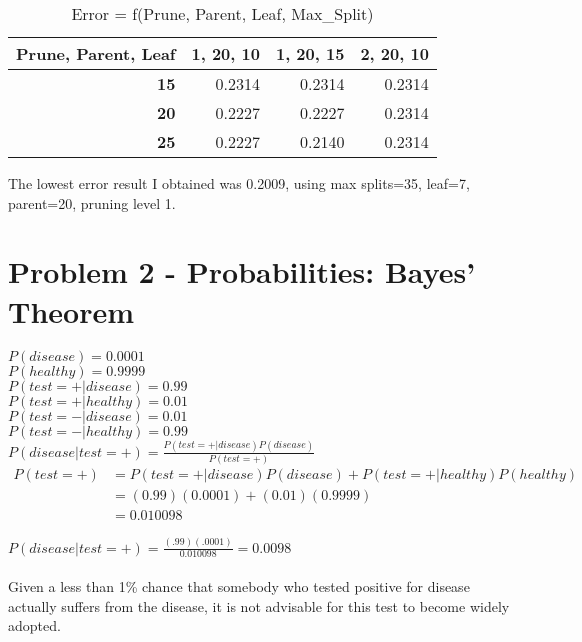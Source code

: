 \documentclass[12pt, letterpaper]{report}
\begin{document}
\begin{table}[H]
	\centering
	\begin{tabular}{ |r|r|r|r| }
		\hline
		\textbf{Prune, Parent, Leaf} & \textbf{1, 20, 10} & \textbf{1, 20, 15} & \textbf{2, 20, 10} \\
		\hline
		\textbf{15} & 0.2314 & 0.2314 & 0.2314 \\
		\hline
		\textbf{20} & 0.2227 & 0.2227 & 0.2314 \\
		\hline
		\textbf{25} & 0.2227 & 0.2140 & 0.2314 \\
		\hline
	\end{tabular}
	\caption{Error = f(Prune, Parent, Leaf, Max\_Split)}
\end{table}


The lowest error result I obtained was 0.2009, using max splits=35, leaf=7, parent=20, pruning level 1.


\section{Problem 2 - Probabilities: Bayes' Theorem}

$P(disease) = 0.0001$ \\
$P(healthy) = 0.9999$ \\
$P(test = + | disease) = 0.99$ \\
$P(test = + | healthy) = 0.01$ \\
$P(test = - | disease) = 0.01$ \\
$P(test = - | healthy) = 0.99$ \\

$P(disease | test = +) = \frac{P(test = + | disease)P(disease)}{P(test = +)}$ \\

\begin{equation*}
\begin{split}
P(test = +) &= P(test = + | disease)P(disease) + P(test = + | healthy)P(healthy)\\
&= (0.99)(0.0001) + (0.01)(0.9999)\\
&= 0.010098
\end{split}
\end{equation*}



$P(disease | test = +) = \frac{(.99)(.0001)}{0.010098} = 0.0098$ \\ \\

Given a less than 1\% chance that somebody who tested positive for disease actually suffers from the disease, it is not advisable for this test to become widely adopted. 
\end{document}
